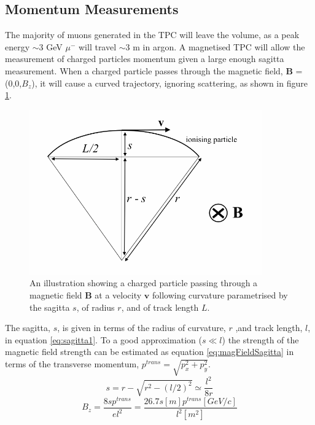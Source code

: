 \subsection{Momentum Measurements}
The majority of muons generated in the TPC will leave the volume, as a peak energy $\sim$3 GeV $\mu^{-}$ will travel $\sim$3 m in argon. A magnetised TPC will allow the measurement of charged particles momentum given a large enough sagitta measurement. When a charged particle passes through the magnetic field, $\boldsymbol{B}$ = (0,0,$B_{z}$), it will cause a curved trajectory, ignoring scattering, as shown in figure \ref{fig:sagitta}. 
\begin{figure}[hbtp]
	\begin{center}
		\includegraphics[width=100mm]{Chapter3/figures/sagittaDrawing.png}
	\caption{An illustration showing a charged particle passing through a magnetic field $\boldsymbol{B}$ at a velocity $\boldsymbol{v}$ following curvature parametrised by the sagitta $s$, of radius $r$, and of track length $L$.  }
	\label{fig:sagitta}
	\end{center}
\end{figure}
The sagitta, $s$, is given in terms of the radius of curvature, $r$ ,and track length, $l$, in equation \ref{eq:sagitta1}. To a good approximation ($s \ll l$) the strength of the magnetic field strength can be estimated as equation \ref{eq:magFieldSagitta} in terms of the transverse momentum, $p^{trans} = \sqrt{p^{2}_{x} + p^{2}_{y}}$.
\begin{equation}
	s = r - \sqrt{r^{2} - (l/2)^{2}} \simeq \frac{l^{2}}{8r}
	\label{eq:sagitta1}
\end{equation}
\begin{equation}
	B_{z} = \frac{8sp^{trans}}{el^{2}} = \frac{26.7s[m] p^{trans} [GeV/c]}{l^{2}[m^{2}]}
	\label{eq:magFieldSagitta}
\end{equation}
